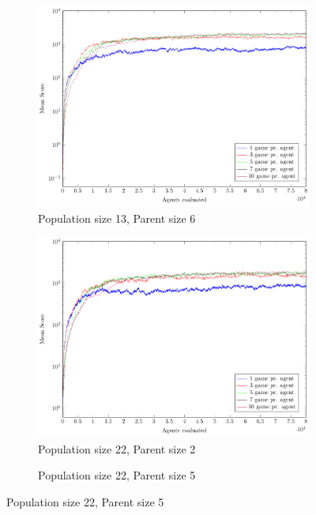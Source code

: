 \begin{figure}
\begin{subfigure}[b]{0.49\textwidth}
    	\caption{Population size 13, Parent size 6}
        \includegraphics[width=\textwidth]{data/ce_population_offspring/13x_split/constant_l13_o6/mean/PlotFile.pdf}
    \end{subfigure}
    \begin{subfigure}[b]{0.49\textwidth}
    	\caption{Population size 22, Parent size 2}
        \includegraphics[width=\textwidth]{data/ce_population_offspring/22x_split/constant_l22_o2/mean/PlotFile.pdf}
    \end{subfigure}
    \begin{subfigure}[b]{0.49\textwidth}
    	\caption{Population size 22, Parent size 5}

\end{subfigure}
\end{figure}
